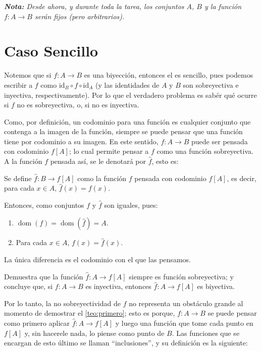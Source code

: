 \documentclass[letterpaper,DIV=14,headsepline,12pt]{scrartcl}
\newcommand{\pts}{}
\newenvironment{ejercicio}[1]{\ifthenelse{\equal{#1}{1} \OR \equal{#1}{+1}}{\renewcommand{\pts}{\textbf{(#1 pt)}}}{\renewcommand{\pts}{\textbf{(#1 pts)}}}\begin{ejj}\upshape \pts}{\end{ejj}}
\newcommand{\id}{\mathrm{id}}
\DeclareMathOperator{\dom}{dom}
\begin{document}
    \textit{\textbf{Nota:} Desde ahora, y durante toda la tarea, los conjuntos $A$, $B$ y la función $f:A \to B$ serán fijos (pero arbitrarios).}

    \section*{Caso Sencillo}

    Notemos que si $f:A \to B$ es una biyección, entonces el es sencillo, pues podemos escribir a $f$ como $\id_B \circ f \circ \id_A$ (y las identidades de $A$ y $B$ son sobreyectiva e inyectiva, respectivamente). Por lo que el verdadero problema es sabér qué ocurre si $f$ no es sobreyectiva, o, si no es inyectiva.

    Como, por definición, un codominio para una función es cualquier conjunto que contenga a la imagen de la función, siempre se puede pensar que una función tiene por codominio a su imagen. En este sentido, $f:A \to B$ puede ser pensada con codominio $f[A]$; lo cual permite pensar a $f$ como una función sobreyectiva. A la función $f$ pensada así, se le denotará por $\hat{f}$, esto es:

    \begin{definicion}
        Se define $\hat{f}:B \to f[A]$ como la función $f$ pensada con codominio $f[A]$, es decir, para cada $x \in A$, $\hat{f}(x)=f(x)$.
    \end{definicion}

    Entonces, como conjuntos $f$ y $\hat{f}$ son iguales, pues:
    \begin{enumerate}
        \item $\dom(f)=\dom(\hat{f})=A$.
        \item Para cada $x \in A$, $f(x)=\hat{f}(x)$.
    \end{enumerate}
    
    La única diferencia es el codominio con el que las pensamos.

    \begin{ejercicio}{1}\label{ej:sobresuimagen}
        Demuestra que la función $\hat{f}:A \to f[A]$ siempre es función sobreyectiva; y concluye que, si $f:A \to B$ es inyectiva, entonces $\hat{f}:A \to f[A]$ es biyectiva.
    \end{ejercicio}

    Por lo tanto, la no sobreyectividad de $f$ no representa un obstáculo grande al momento de demostrar el \autoref{teo:primero}; esto es porque, $f:A \to B$ se puede pensar como primero aplicar $\hat{f}:A \to f[A]$ y luego una función que tome cada punto en $f[A]$ y, sin hacerele nada, lo piense como punto de $B$. Las funciones que se encargan de esto último se llaman ``inclusiones'', y su definición es la siguiente:
\end{document}
